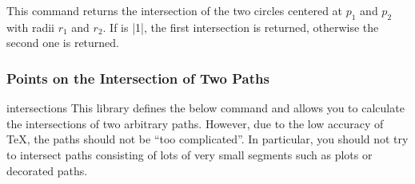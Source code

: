 \begin{command}{\pgfpointintersectionofcircles{}}
    This command returns the intersection of the two circles centered at $p_1$
    and $p_2$ with radii $r_1$ and $r_2$. If  is |1|, the first
    intersection is returned, otherwise the second one is returned.
\begin{codeexample}[]
\end{codeexample}
\end{command}


\subsubsection{Points on the Intersection of Two Paths}

\begin{pgflibrary}{intersections}
    This library defines the below command and allows you to calculate the
    intersections of  two arbitrary paths. However, due to the low accuracy of
    \TeX, the paths should not be ``too complicated''. In particular, you
    should not try to intersect paths consisting of lots of very small segments
    such as plots or decorated paths.
\end{pgflibrary}

